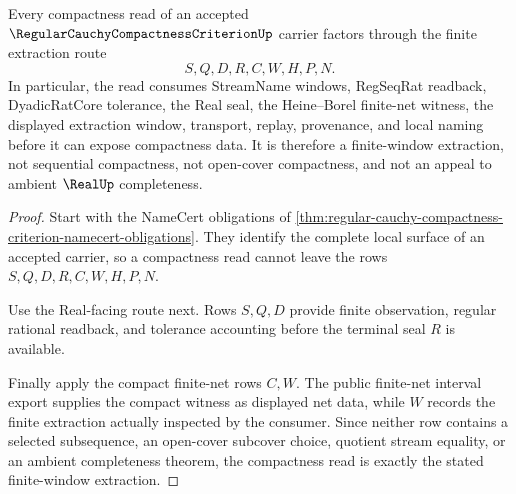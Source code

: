 \begin{theorem}
\label{thm:regular-cauchy-compactness-criterion-finite-window-extraction}
Every compactness read of an accepted $\RegularCauchyCompactnessCriterionUp$ carrier factors through the finite extraction route
$$
S,Q,D,R,C,W,H,P,N.
$$
In particular, the read consumes StreamName windows, RegSeqRat readback, DyadicRatCore tolerance, the Real seal, the Heine--Borel finite-net witness, the displayed extraction window, transport, replay, provenance, and local naming before it can expose compactness data. It is therefore a finite-window extraction, not sequential compactness, not open-cover compactness, and not an appeal to ambient $\RealUp$ completeness.
\end{theorem}
\begin{proof}
Start with the NameCert obligations of \autoref{thm:regular-cauchy-compactness-criterion-namecert-obligations}. They identify the complete local surface of an accepted carrier, so a compactness read cannot leave the rows $S,Q,D,R,C,W,H,P,N$.

Use the Real-facing route next. Rows $S,Q,D$ provide finite observation, regular rational readback, and tolerance accounting before the terminal seal $R$ is available.

Finally apply the compact finite-net rows $C,W$. The public finite-net interval export supplies the compact witness as displayed net data, while $W$ records the finite extraction actually inspected by the consumer. Since neither row contains a selected subsequence, an open-cover subcover choice, quotient stream equality, or an ambient completeness theorem, the compactness read is exactly the stated finite-window extraction.
\end{proof}


